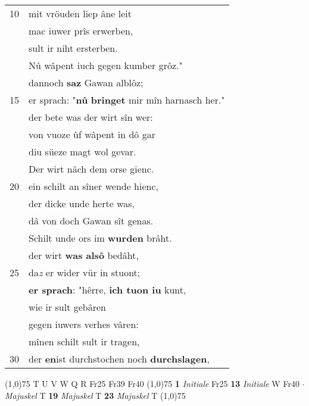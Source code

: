 \documentclass[8pt,a4paper,notitlepage]{article}
\begin{document}
\begin{table}[ht]
\begin{minipage}[t]{0.5\linewidth}
\begin{tabular}{rl}
10 & mit vröuden liep âne leit\\ 
 & mac iuwer prîs erwerben,\\ 
 & sult ir niht ersterben.\\ 
 & Nû wâpent iuch gegen kumber grôz."\\ 
 & dannoch \textbf{saz} Gawan alblôz;\\ 
15 & er sprach: "\textbf{nû} \textbf{bringet} mir mîn harnasch her."\\ 
 & der bete was der wirt sîn wer:\\ 
 & von vuoze ûf wâpent in dô gar\\ 
 & diu süeze magt wol gevar.\\ 
 & Der wirt nâch dem orse gienc.\\ 
20 & ein schilt an sîner wende hienc,\\ 
 & der dicke unde herte was,\\ 
 & dâ von doch Gawan sît genas.\\ 
 & Schilt unde ors im \textbf{wurden} brâht.\\ 
 & der wirt \textbf{was alsô} bedâht,\\ 
25 & da\textit{z} er wider vür in stuont;\\ 
 & \textbf{er sprach}: "hêrre, \textbf{ich tuon iu} kunt,\\ 
 & wie ir sult gebâren\\ 
 & gegen iuwers verhes vâren:\\ 
 & mînen schilt sult ir tragen,\\ 
30 & der \textbf{en}ist durchstochen noch \textbf{durchslagen},\\ 
\end{tabular}
\scriptsize
\line(1,0){75} \newline
T U V W Q R Fr25 Fr39 Fr40 \newline
\line(1,0){75} \newline
\textbf{1} \textit{Initiale} Fr25  \textbf{13} \textit{Initiale} W Fr40   $\cdot$ \textit{Majuskel} T  \textbf{19} \textit{Majuskel} T  \textbf{23} \textit{Majuskel} T  \newline
\line(1,0){75} \newline

\end{minipage}
\end{table}
\end{document}
